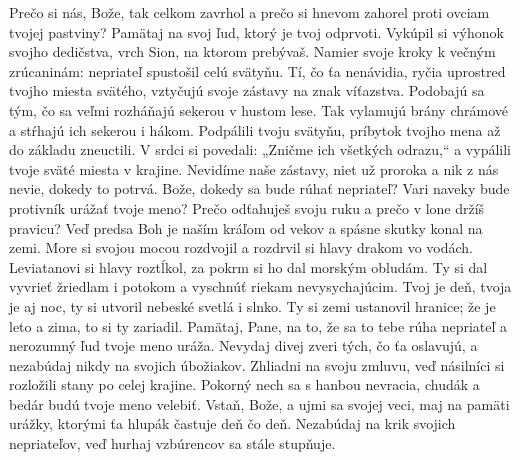 Prečo si nás, Bože, tak celkom zavrhol
a prečo si hnevom zahorel proti ovciam tvojej pastviny?
\versseparator
Pamätaj na svoj ľud,
ktorý je tvoj odprvoti.
\versseparator
Vykúpil si výhonok svojho dedičstva,
vrch Sion, na ktorom prebývaš.
\versseparator
Namier svoje kroky k večným zrúcaninám:
nepriateľ spustošil celú svätyňu.
\versseparator
Tí, čo ťa nenávidia, ryčia
uprostred tvojho miesta svätého,
\versseparator
vztyčujú svoje zástavy na znak víťazstva.
Podobajú sa tým, čo sa veľmi rozháňajú sekerou
\versseparator
v hustom lese.
Tak vylamujú brány chrámové
a stŕhajú ich sekerou i hákom.
\versseparator
Podpálili tvoju svätyňu,
príbytok tvojho mena až do základu zneuctili.
\versseparator
V srdci si povedali: „Zničme ich všetkých odrazu,“
a vypálili tvoje sväté miesta v krajine.
\versseparator
Nevidíme naše zástavy,
niet už proroka
a nik z nás nevie, dokedy to potrvá.
\versseparator
Bože, dokedy sa bude rúhať nepriateľ?
Vari naveky bude protivník urážať tvoje meno?
\versseparator
Prečo odťahuješ svoju ruku
a prečo v lone držíš pravicu?
\versseparator
Veď predsa Boh je naším kráľom od vekov
a spásne skutky konal na zemi.
\versseparator
More si svojou mocou rozdvojil
a rozdrvil si hlavy drakom vo vodách.
\versseparator
Leviatanovi si hlavy roztĺkol,
za pokrm si ho dal morským obludám.
\versseparator
Ty si dal vyvrieť žriedlam i potokom
a vyschnúť riekam nevysychajúcim.
\versseparator
Tvoj je deň, tvoja je aj noc,
ty si utvoril nebeské svetlá i slnko.
\versseparator
Ty si zemi ustanovil hranice;
že je leto a zima, to si ty zariadil.
\versseparator
Pamätaj, Pane, na to,
že sa to tebe rúha nepriateľ
a nerozumný ľud tvoje meno uráža.
\versseparator
Nevydaj divej zveri tých, čo ťa oslavujú,
a nezabúdaj nikdy na svojich úbožiakov.
\versseparator
Zhliadni na svoju zmluvu,
veď násilníci si rozložili stany po celej krajine.
\versseparator
Pokorný nech sa s hanbou nevracia,
chudák a bedár budú tvoje meno velebiť.
\versseparator
Vstaň, Bože, a ujmi sa svojej veci,
maj na pamäti urážky,
ktorými ťa hlupák častuje deň čo deň.
\versseparator
Nezabúdaj na krik svojich nepriateľov,
veď hurhaj vzbúrencov sa stále stupňuje.